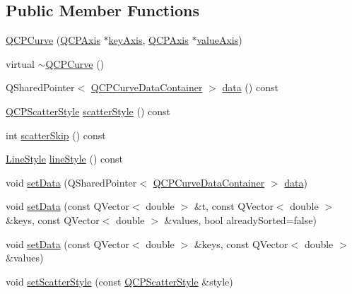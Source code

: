 \subsection*{Public Member Functions}
\begin{DoxyCompactItemize}
\item 
\mbox{\hyperlink{class_q_c_p_curve_a36de58e2652b3fa47bdf9187d421d3ce}{Q\+C\+P\+Curve}} (\mbox{\hyperlink{class_q_c_p_axis}{Q\+C\+P\+Axis}} $\ast$\mbox{\hyperlink{class_q_c_p_abstract_plottable_a2cdd6f0dd5e9a979037f86b4000d9cfe}{key\+Axis}}, \mbox{\hyperlink{class_q_c_p_axis}{Q\+C\+P\+Axis}} $\ast$\mbox{\hyperlink{class_q_c_p_abstract_plottable_af47809a644a68ffd955fb30b01fb4f2f}{value\+Axis}})
\item 
virtual \mbox{\hyperlink{class_q_c_p_curve_a99ee5136754884a220cc0bcacfe419a3}{$\sim$\+Q\+C\+P\+Curve}} ()
\item 
Q\+Shared\+Pointer$<$ \mbox{\hyperlink{qcustomplot_8h_aaeee80d5664ea91beb9d7968790d0e65}{Q\+C\+P\+Curve\+Data\+Container}} $>$ \mbox{\hyperlink{class_q_c_p_curve_a761492fd00b1ab7cb18ce23c118c6c60}{data}} () const
\item 
\mbox{\hyperlink{class_q_c_p_scatter_style}{Q\+C\+P\+Scatter\+Style}} \mbox{\hyperlink{class_q_c_p_curve_afa6bd72a3a331a5ed45d3e0c5843b592}{scatter\+Style}} () const
\item 
int \mbox{\hyperlink{class_q_c_p_curve_a09b33217172aedf6c62c441b4ff66166}{scatter\+Skip}} () const
\item 
\mbox{\hyperlink{class_q_c_p_curve_a2710e9f79302152cff794c6e16cc01f1}{Line\+Style}} \mbox{\hyperlink{class_q_c_p_curve_a06e3cf3f8f1add689254b3cda66e040e}{line\+Style}} () const
\item 
void \mbox{\hyperlink{class_q_c_p_curve_a41246850d2e080bc57183ca19cd4135e}{set\+Data}} (Q\+Shared\+Pointer$<$ \mbox{\hyperlink{qcustomplot_8h_aaeee80d5664ea91beb9d7968790d0e65}{Q\+C\+P\+Curve\+Data\+Container}} $>$ \mbox{\hyperlink{class_q_c_p_curve_a761492fd00b1ab7cb18ce23c118c6c60}{data}})
\item 
void \mbox{\hyperlink{class_q_c_p_curve_a0768af2c33c8dcffa3cf5bdeb53923a6}{set\+Data}} (const Q\+Vector$<$ double $>$ \&t, const Q\+Vector$<$ double $>$ \&keys, const Q\+Vector$<$ double $>$ \&values, bool already\+Sorted=false)
\item 
void \mbox{\hyperlink{class_q_c_p_curve_a9d3245d43304226e013240c94802f7f6}{set\+Data}} (const Q\+Vector$<$ double $>$ \&keys, const Q\+Vector$<$ double $>$ \&values)
\item 
void \mbox{\hyperlink{class_q_c_p_curve_a55e43b44709bf50a35500644988aa706}{set\+Scatter\+Style}} (const \mbox{\hyperlink{class_q_c_p_scatter_style}{Q\+C\+P\+Scatter\+Style}} \&style)

\end{DoxyCompactItemize}
